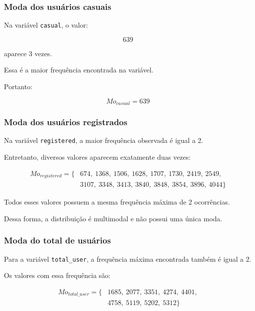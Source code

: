 \documentclass[12pt,a4paper]{article}
\begin{document}
\subsubsection*{Moda dos usuários casuais}

Na variável \texttt{casual}, o valor:

\begin{equation}
639
\end{equation}

aparece 3 vezes.

Essa é a maior frequência encontrada na variável.

Portanto:

\begin{equation}
\boxed{Mo_{casual} = 639}
\end{equation}

\subsubsection*{Moda dos usuários registrados}

Na variável \texttt{registered}, a maior frequência observada é igual a 2.

Entretanto, diversos valores aparecem exatamente duas vezes:

\begin{equation}
\begin{split}
Mo_{registered} = \{&
674,\ 1368,\ 1506,\ 1628,\ 1707,\ 1730,\ 2419,\ 2549,\\
&3107,\ 3348,\ 3413,\ 3840,\ 3848,\ 3854,\ 3896,\ 4044
\}
\end{split}
\end{equation}

Todos esses valores possuem a mesma frequência máxima de 2 ocorrências.

Dessa forma, a distribuição é multimodal e não possui uma única moda.

\subsubsection*{Moda do total de usuários}

Para a variável \texttt{total\_user}, a frequência máxima encontrada também
é igual a 2.

Os valores com essa frequência são:

\begin{equation}
\begin{split}
Mo_{total\_user} = \{&
1685,\ 2077,\ 3351,\ 4274,\ 4401,\\
&4758,\ 5119,\ 5202,\ 5312
\}
\end{split}
\end{equation}
\end{document}
